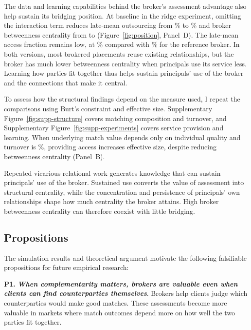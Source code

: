The data and learning capabilities behind the broker's assessment advantage also help sustain its bridging position. At baseline in the ridge experiment, omitting the interaction term reduces late-mean outsourcing from \% to \% and broker betweenness centrality from  to  (Figure~\ref{fig:position}, Panel~D). The late-mean access fraction remains low, at \% compared with \% for the reference broker. In both versions, most brokered placements reuse existing relationships, but the broker has much lower betweenness centrality when principals use its service less. Learning how parties fit together thus helps sustain principals' use of the broker and the connections that make it central.

To assess how the structural findings depend on the measure used, I repeat the comparisons using Burt's constraint and effective size. Supplementary Figure~\ref{fig:supp-structure} covers matching composition and turnover, and Supplementary Figure~\ref{fig:supp-experiments} covers service provision and learning. When underlying match value depends only on individual quality and turnover is \%, providing access increases effective size, despite reducing betweenness centrality (Panel~B).

Repeated vicarious relational work generates knowledge that can sustain principals' use of the broker. Sustained use converts the value of assessment into structural centrality, while the concentration and persistence of principals' own relationships shape how much centrality the broker attains. High broker betweenness centrality can therefore coexist with little bridging.

\subsection{Propositions}

The simulation results and theoretical argument motivate the following falsifiable propositions for future empirical research:

\noindent\textbf{P1.} \textbf{\textit{When complementarity matters, brokers are valuable even when clients can find counterparties themselves}}. Brokers help clients judge which counterparties would make good matches. These assessments become more valuable in markets where match outcomes depend more on how well the two parties fit together.


